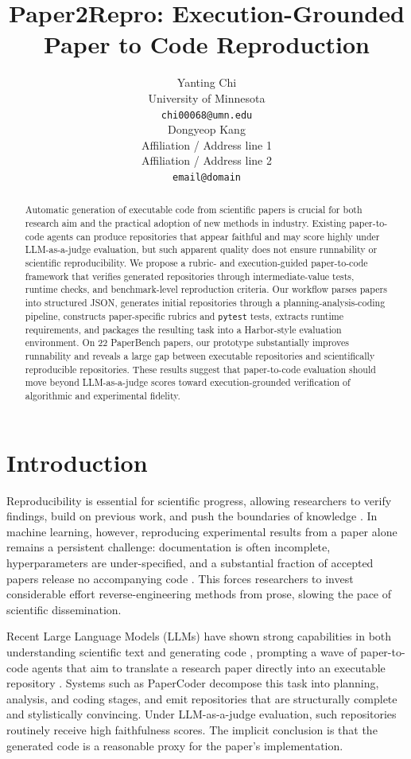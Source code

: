 \documentclass[11pt]{article}
\title{Paper2Repro: Execution-Grounded Paper to Code Reproduction}
\author{Yanting Chi \\
  University of Minnesota \\
  \texttt{chi00068@umn.edu} \\\And
  Dongyeop Kang \\
  Affiliation / Address line 1 \\
  Affiliation / Address line 2 \\
  \texttt{email@domain} \\}
\begin{document}
\maketitle

\begin{abstract}
Automatic generation of executable code from scientific papers is crucial
for both research aim and the practical adoption of
new methods in industry. Existing paper-to-code agents can produce
repositories that appear faithful and may score highly under
LLM-as-a-judge evaluation, but such apparent quality does not
ensure runnability or scientific reproducibility. We propose a
rubric- and execution-guided paper-to-code framework that
verifies generated repositories through intermediate-value
tests, runtime checks, and benchmark-level reproduction
criteria. Our workflow parses papers into structured JSON,
generates initial repositories through a planning-analysis-coding
pipeline, constructs paper-specific rubrics and \texttt{pytest}
tests, extracts runtime requirements, and packages the resulting
task into a Harbor-style evaluation environment. On 22
PaperBench papers, our prototype substantially improves
runnability and reveals a large gap between executable
repositories and scientifically reproducible repositories. These
results suggest that paper-to-code evaluation should move beyond
LLM-as-a-judge scores toward execution-grounded verification of
algorithmic and experimental fidelity.
\end{abstract}

\section{Introduction}

Reproducibility is essential for scientific progress, allowing
researchers to verify findings, build on previous work, and push the
boundaries of knowledge \citep{collaboration2015estimating, baker20161,
pineau2021improving}. In machine learning, however, reproducing
experimental results from a paper alone remains a persistent challenge:
documentation is often incomplete, hyperparameters are under-specified,
and a substantial fraction of accepted papers release no accompanying
code \citep{seo2025papercoder}. This forces researchers to invest
considerable effort reverse-engineering methods from prose, slowing
the pace of scientific dissemination.

Recent Large Language Models (LLMs) have shown strong capabilities in
both understanding scientific text and generating code
\citep{dubey2024llama, openai2024gpt4, reid2024gemini}, prompting a
wave of paper-to-code agents that aim to translate a research paper
directly into an executable repository \citep{seo2025papercoder,
starace2025paperbench, siegel2024corebench}. Systems such as
PaperCoder \citep{seo2025papercoder} decompose this task into
planning, analysis, and coding stages, and emit repositories that are
structurally complete and stylistically convincing. Under
LLM-as-a-judge evaluation, such repositories routinely receive high
faithfulness scores. The implicit conclusion is that the generated
code is a reasonable proxy for the paper's implementation.
\end{document}
